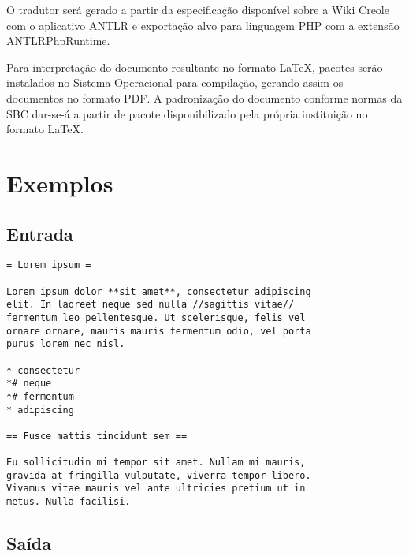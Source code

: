 \documentclass{article}
\begin{document}
O tradutor será gerado a partir da especificação disponível sobre a Wiki Creole
com o aplicativo ANTLR e exportação alvo para linguagem PHP com a extensão
ANTLRPhpRuntime.

Para interpretação do documento resultante no formato \LaTeX{}, pacotes serão
instalados no Sistema Operacional para compilação, gerando assim os documentos
no formato PDF. A padronização do documento conforme normas da SBC dar-se-á a
partir de pacote disponibilizado pela própria instituição no formato \LaTeX{}.

\section{Exemplos}
\label{sec:exemplos}

\subsection{Entrada}

\begin{verbatim}
= Lorem ipsum =

Lorem ipsum dolor **sit amet**, consectetur adipiscing
elit. In laoreet neque sed nulla //sagittis vitae//
fermentum leo pellentesque. Ut scelerisque, felis vel
ornare ornare, mauris mauris fermentum odio, vel porta
purus lorem nec nisl.

* consectetur
*# neque
*# fermentum
* adipiscing

== Fusce mattis tincidunt sem ==

Eu sollicitudin mi tempor sit amet. Nullam mi mauris,
gravida at fringilla vulputate, viverra tempor libero.
Vivamus vitae mauris vel ante ultricies pretium ut in
metus. Nulla facilisi.
\end{verbatim}

\subsection{Saída}
\end{document}
